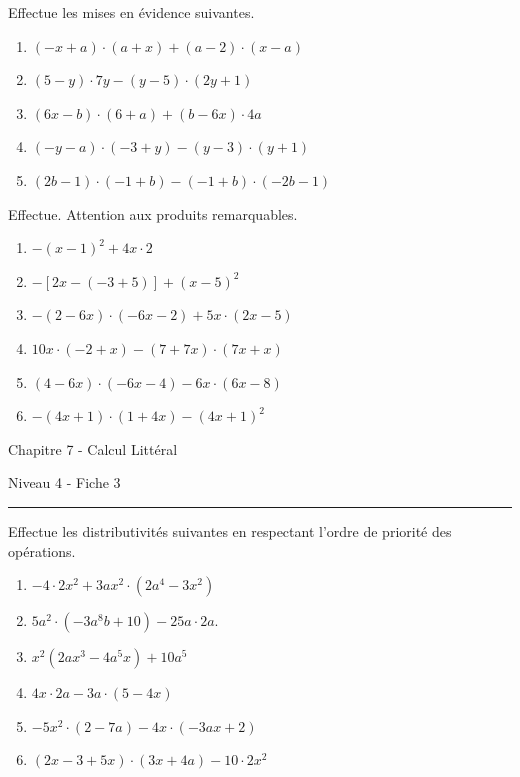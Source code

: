 \documentclass[12pt,parskip=half-, twoside=semi]{scrartcl}
\begin{document}
\begin{exercise}Effectue les mises en évidence suivantes.
  \begin{enumerate}[cols=2]
      \item $(-x+a) \cdot(a+x)+(a-2) \cdot(x-a)$
      \item $(5-y) \cdot 7 y-(y-5) \cdot(2 y+1)$
      \item $(6 x-b) \cdot(6+a)+(b-6 x) \cdot 4 a$
      \item $(-y-a) \cdot(-3+y)-(y-3) \cdot(y+1)$
      \item $(2 b-1) \cdot(-1+b)-(-1+b) \cdot(-2 b-1)$
  \end{enumerate}
\end{exercise}


\begin{exercise}Effectue. Attention aux produits remarquables.
  \begin{enumerate}
      \item $-(x-1)^2+4 x \cdot 2$
      \item $-[2 x-(-3+5)]+(x-5)^2$
      \item $-(2-6 x) \cdot(-6 x-2)+5 x \cdot(2 x-5)$
      \item $10 x \cdot(-2+x)-(7+7 x) \cdot(7 x+x)$
      \item $(4-6 x) \cdot(-6 x-4)-6 x \cdot(6 x-8)$
      \item $-(4 x+1) \cdot(1+4 x)-(4 x+1)^2$
  \end{enumerate}
\end{exercise}

\newpage
\begin{center}
  \bfseries
  \begin{Huge}
    Chapitre 7 - Calcul Littéral
  \end{Huge}
  \smallbreak
  \begin{large}
    Niveau 4  - Fiche 3
  \end{large}
  \smallbreak
  \rule[10pt]{.5\linewidth}{1 pt}
\end{center}
 
\setcounter{exercise}{0}


\begin{exercise}Effectue les distributivités suivantes en respectant l'ordre de priorité des opérations.
  \begin{enumerate}[cols=2]
      \item $-4 \cdot 2 x^2+3 a x^2 \cdot\left(2 a^4-3 x^2\right)$
      \item $5 a^2 \cdot\left(-3 a^8 b+10\right)-25 a \cdot 2 a$.
      \item $x^2\left(2 a x^3-4 a^5 x\right)+10 a^5$
      \item $4 x \cdot 2 a-3 a \cdot(5-4 x)$
      \item $-5 x^2 \cdot(2-7 a)-4 x \cdot(-3 a x+2)$
      \item $(2 x-3+5 x) \cdot(3 x+4 a)-10 \cdot 2 x^2$
  \end{enumerate}
\end{exercise}
\end{document}
